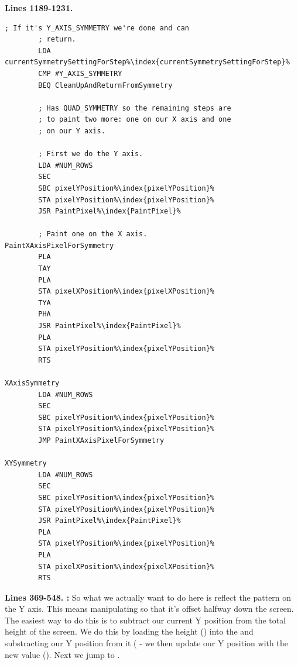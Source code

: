 \clearpage
\textbf{Lines 1189-1231. }
\begin{lstlisting}[escapechar=\%]
        ; If it's Y_AXIS_SYMMETRY we're done and can 
        ; return.
        LDA currentSymmetrySettingForStep%\index{currentSymmetrySettingForStep}%
        CMP #Y_AXIS_SYMMETRY
        BEQ CleanUpAndReturnFromSymmetry

        ; Has QUAD_SYMMETRY so the remaining steps are
        ; to paint two more: one on our X axis and one
        ; on our Y axis.

        ; First we do the Y axis.
        LDA #NUM_ROWS
        SEC 
        SBC pixelYPosition%\index{pixelYPosition}%
        STA pixelYPosition%\index{pixelYPosition}%
        JSR PaintPixel%\index{PaintPixel}%

        ; Paint one on the X axis.
PaintXAxisPixelForSymmetry    
        PLA 
        TAY 
        PLA 
        STA pixelXPosition%\index{pixelXPosition}%
        TYA 
        PHA 
        JSR PaintPixel%\index{PaintPixel}%
        PLA 
        STA pixelYPosition%\index{pixelYPosition}%
        RTS 

XAxisSymmetry   
        LDA #NUM_ROWS
        SEC 
        SBC pixelYPosition%\index{pixelYPosition}%
        STA pixelYPosition%\index{pixelYPosition}%
        JMP PaintXAxisPixelForSymmetry

XYSymmetry   
        LDA #NUM_ROWS
        SEC 
        SBC pixelYPosition%\index{pixelYPosition}%
        STA pixelYPosition%\index{pixelYPosition}%
        JSR PaintPixel%\index{PaintPixel}%
        PLA 
        STA pixelYPosition%\index{pixelYPosition}%
        PLA 
        STA pixelXPosition%\index{pixelXPosition}%
        RTS 
\end{lstlisting}
\clearpage

\textbf{Lines 369-548. :} So what we actually want to do here is reflect the pattern on the Y axis. This means manipulating  so that it's
offset halfway down the screen.  The easiest way to do this is to subtract our current Y position from the total height of the screen.
We do this by loading the height () into the  and substracting our Y position from it 
( - we then update our Y position with the new value (). Next we jump to
.

